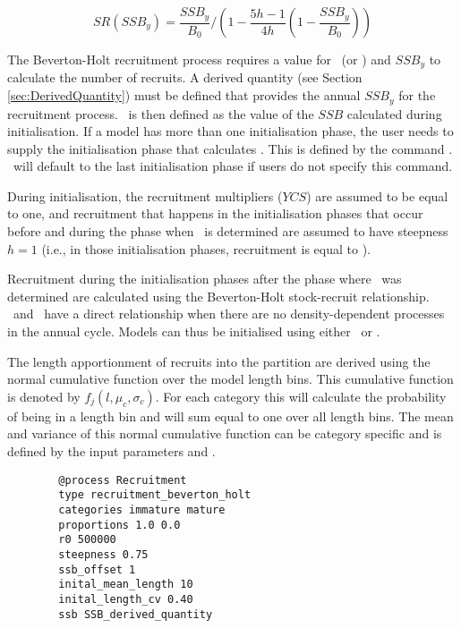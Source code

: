 \begin{equation}\label{eq:BH_SR}
SR(SSB_y) = \frac{SSB_y}{B_0} / \left( 1-\frac{5h-1}{4h} \left( 1-\frac{SSB_y}{B_0} \right) \right)
\end{equation}

The Beverton-Holt recruitment process requires a value for \Bzero\ (or \Rzero) and $SSB_y$ to calculate the number of recruits. A derived quantity (see Section \ref{sec:DerivedQuantity}) must be defined that provides the annual $SSB_y$ for the recruitment process. \Bzero\ is then defined as the value of the $SSB$ calculated during initialisation. If a model has more than one initialisation phase, the user needs to supply the initialisation phase that calculates \Bzero. This is defined by the command . \CNAME\ will default to the last initialisation phase if users do not specify this command.

During initialisation, the recruitment multipliers ($YCS$) are assumed to be equal to one, and recruitment that happens in the initialisation phases that occur before and during the phase when \Bzero\ is determined are assumed to have steepness $h=1$ (i.e., in those initialisation phases, recruitment is equal to \Rzero).

Recruitment during the initialisation phases after the phase where \Bzero\ was determined are calculated using the Beverton-Holt stock-recruit relationship. \Rzero\ and \Bzero\ have a direct relationship when there are no density-dependent processes in the annual cycle. Models can thus be initialised using either \Bzero\ or \Rzero.

The length apportionment of recruits into the partition are derived using the normal cumulative function over the model length bins. This cumulative function is denoted by \(f_j(l,\mu_c, \sigma_c)\). For each category this will calculate the probability of being in a length bin and will  sum equal to one over all length bins. The mean and variance of this normal cumulative function can be category specific and is defined by the input parameters  and .


{\small{\begin{verbatim}
		@process Recruitment
		type recruitment_beverton_holt
		categories immature mature
		proportions 1.0 0.0
		r0 500000
		steepness 0.75
		ssb_offset 1
		inital_mean_length 10
		inital_length_cv 0.40
		ssb SSB_derived_quantity
		\end{verbatim}}}

